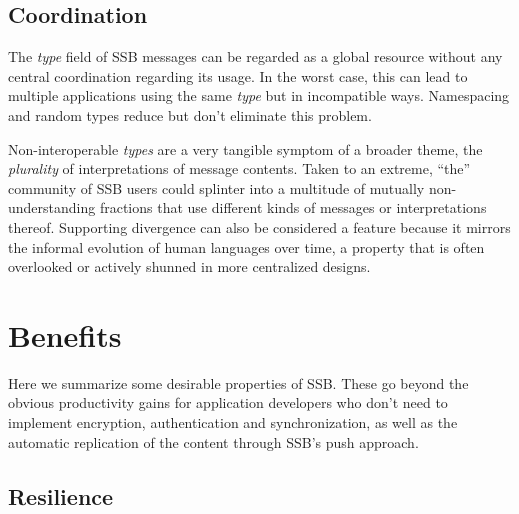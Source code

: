 \documentclass[9pt,sigconf]{acmart}
\begin{document}
\subsection{Coordination}

The \textit{type} field of SSB messages can be regarded as a global resource without any central coordination regarding its usage. In the worst case, this can lead to multiple applications using the same \textit{type} but in incompatible ways. Namespacing and random types reduce but don't eliminate this problem.

Non-interoperable \textit{types} are a very tangible symptom of a broader theme, the \textit{plurality} of interpretations of message contents. Taken to an extreme, ``the'' community of SSB users could splinter into a multitude of mutually non-understanding fractions that use different kinds of messages or interpretations thereof. Supporting divergence can also be considered a feature because it mirrors the informal evolution of human languages over time, a property that is often overlooked or actively shunned in more centralized designs.

%
%
%
%

\section{Benefits}
\label{sect:yay}

Here we summarize some desirable properties of SSB. These go beyond the obvious productivity gains for application developers who don't need to implement encryption, authentication and synchronization, as well as the automatic replication of the content through SSB's push approach.

\subsection{Resilience}
\end{document}
